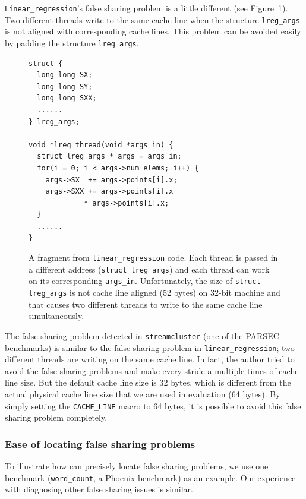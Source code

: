 \texttt{Linear\_regression}'s false sharing problem is a little different (see Figure~\ref{fig:linear_regression}). 
Two different threads write to the same cache line when the structure \texttt{lreg\_args} is not aligned with corresponding cache lines. This problem can be avoided easily by padding the structure \texttt{lreg\_args}.

\begin{figure}[!t]
\begin{lstlisting}[style=tt]
struct {
  long long SX;
  long long SY;
  long long SXX;
  ......
} lreg_args;

void *lreg_thread(void *args_in) {
  struct lreg_args * args = args_in;
  for(i = 0; i < args->num_elems; i++) {
    args->SX  += args->points[i].x;
    args->SXX += args->points[i].x 
   	         * args->points[i].x;
  }
  ......	
}
\end{lstlisting}
\caption{A fragment from \texttt{linear\_regression} code. Each thread is passed in a different address (\texttt{struct lreg\_args}) and each thread can work on its corresponding \texttt{args\_in}. 
Unfortunately, the size of \texttt{struct lreg\_args} is not cache line aligned (52 bytes) on 32-bit machine and that causes two different threads to write to the same cache line simultaneously. 
\label{fig:linear_regression}}
\end{figure}

The false sharing problem detected in \texttt{streamcluster} (one of the PARSEC benchmarks) is similar to the false sharing problem in \texttt{linear\_regression}; two different threads are writing on the same cache line.  In fact, the author tried to avoid the false sharing problems and make every stride a multiple times of cache line size. But the default cache line size is 32 bytes, which is different from the actual physical cache line size that we are used in evaluation (64 bytes).  By simply setting the \texttt{CACHE\_LINE} macro to 64 bytes, it is possible to avoid this false sharing problem completely.


\subsubsection{Ease of locating false sharing problems}

\label{sec:fsfixexample}

To illustrate how \sheriffdetect{} can precisely locate false sharing problems, we use one benchmark (\texttt{word\_count}, a Phoenix benchmark) as an example. Our experience with diagnosing other false sharing issues is similar.

